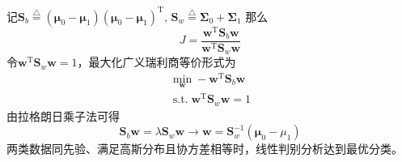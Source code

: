 记$\boldsymbol{S}_{b} \overset{\triangle}{=}\left( \boldsymbol{\mu}_0-\boldsymbol{\mu}_1 \right)\left( \boldsymbol{\mu}_0-\boldsymbol{\mu}_1 \right)^{\mathrm{T}},\, \boldsymbol{S}_{w} \overset{\triangle}{=}\boldsymbol{\Sigma}_0 + \boldsymbol{\Sigma}_1$
那么
\[
    J = \dfrac{\boldsymbol{w}^{\mathrm{T}}\boldsymbol{S}_{b}\boldsymbol{w}}{ \boldsymbol{w}^{\mathrm{T}}\boldsymbol{S}_{w}\boldsymbol{w}}
\]
令$ \boldsymbol{w}^{\mathrm{T}}\boldsymbol{S}_{w}\boldsymbol{w} = 1$，最大化广义瑞利商等价形式为
\[
    \begin{array}{c}
        \min\limits_{\boldsymbol{w}} -\boldsymbol{w}^{\mathrm{T}}\boldsymbol{S}_{b}\boldsymbol{w}\\
        \operatorname{s.t.} \boldsymbol{w}^{\mathrm{T}}\boldsymbol{S}_{w}\boldsymbol{w} = 1
    \end{array}
\]
\textcolor{main1}{由拉格朗日乘子法可得}
\[
    \boldsymbol{S}_b\boldsymbol{w} = \lambda\boldsymbol{S}_{w}\boldsymbol{w}\rightarrow \boldsymbol{w} = \boldsymbol{S}_{w}^{-1}\left( \boldsymbol{\mu}_0-\mu_{1} \right)    
\]
两类数据同先验、满足高斯分布且协方差相等时，线性判别分析达到最优分类。
